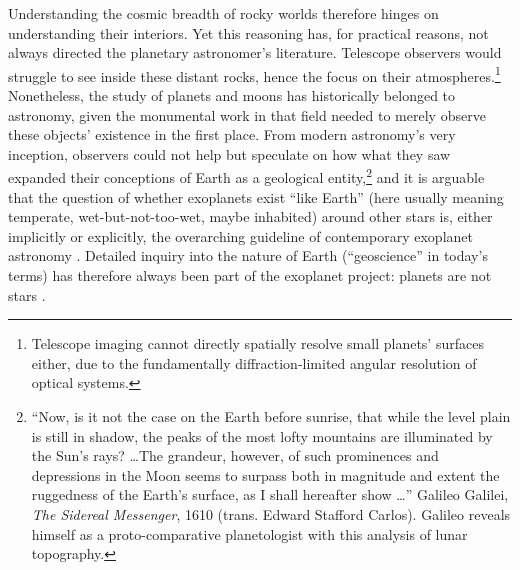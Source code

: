 Understanding the cosmic breadth of rocky worlds therefore hinges on understanding their interiors. Yet this reasoning has, for practical reasons, not always directed the planetary astronomer's literature. Telescope observers would struggle to see inside these distant rocks, hence the focus on their atmospheres.\footnote{Telescope imaging cannot directly spatially resolve small planets' surfaces either, due to the fundamentally diffraction-limited angular resolution of optical systems.\label{foot:diffraction-limit}} Nonetheless, the study of planets and moons has historically belonged to astronomy, given the monumental work in that field needed to merely observe these objects' existence in the first place. From modern astronomy's very inception, observers could not help but speculate on how what they saw expanded their conceptions of Earth as a geological entity,\footnote{``Now, is it not the case on the Earth before sunrise, that while the level plain is still in shadow, the peaks of the most lofty mountains are illuminated by the Sun's rays? \ldots The grandeur, however, of such prominences and depressions in the Moon seems to surpass both in magnitude and extent the ruggedness of the Earth's surface, as I shall hereafter show \ldots '' {\sc Galileo Galilei, \textit{The Sidereal Messenger}, 1610 (trans. Edward Stafford Carlos).} Galileo reveals himself as a proto-comparative planetologist with this analysis of lunar topography.} 
 and it is arguable that the question of whether exoplanets exist ``like Earth'' (here usually meaning temperate, wet-but-not-too-wet, maybe inhabited) around other stars is, either implicitly or explicitly, the overarching guideline of contemporary exoplanet astronomy \citep[e.g.,][]{decadalsurveyonastronomyandastrophysics2020astro2020_pathways_2021}. Detailed inquiry into the nature of Earth (``geoscience'' in today's terms) has therefore always been part of the exoplanet project: planets are not stars \citep{taylor_why_2004}.


